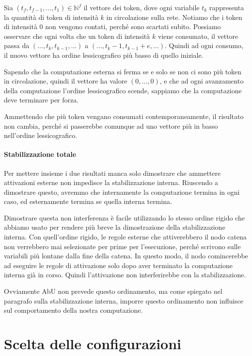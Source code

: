 \documentclass[target=bach]{thud}
\begin{document}
Sia $(t_f,t_{f-1},...,t_1)\in\mathbb{N}^f$ il vettore dei token, dove ogni variabile $t_k$ rappresenta la quantità di token di intensità $k$ in circolazione sulla rete. Notiamo che i token di intensità $0$ non vengono contati, perché sono scartati subito.
Possiamo osservare che ogni volta che un token di intensità $k$ viene consumato, il vettore passa da $(...,t_k,t_{k-1},...)$ a $(...,t_k-1,t_{k-1}+e,...)$. Quindi ad ogni consumo, il nuovo vettore ha ordine lessicografico più basso di quello iniziale.

Sapendo che la computazione esterna si ferma se e solo se non ci sono più token in circolazione, quindi il vettore ha valore $(0,...,0)$, e che ad ogni avanzamento della computazione l'ordine lessicografico scende, sappiamo che la computazione deve terminare per forza.

Ammettendo che più token vengano consumati contemporaneamente, il risultato non cambia, perché si passerebbe comunque ad uno vettore più in basso nell'ordine lessicografico.

\paragraph{Stabilizzazione totale}

Per mettere insieme i due risultati manca solo dimostrare che ammettere attivazioni esterne non impedisce la stabilizzazione interna. Riuscendo a dimostrare questo, avremmo che internamente la computazione termina in ogni caso, ed esternamente termina se quella interna termina.

Dimostrare questa non interferenza è facile utilizzando lo stesso ordine rigido che abbiamo usato per rendere più breve la dimostrazione della stabilizzazione interna. Con quell'ordine rigido, le regole esterne che attiverebbero il nodo catena non verrebbero mai selezionate per prime per l'esecuzione, perché scrivono sulle variabili più lontane dalla fine della catena.
In questo modo, il nodo comincerebbe ad eseguire le regole di attivazione solo dopo aver terminato la computazione interna già in corso. Quindi l'attivazione non interferirebbe con la stabilizzazione.

Ovviamente AbU non prevede questo ordinamento, ma come spiegato nel paragrafo sulla stabilizzazione interna, imporre questo ordinamento non influisce sul comportamento della nostra computazione.

\section{Scelta delle configurazioni}
\end{document}
